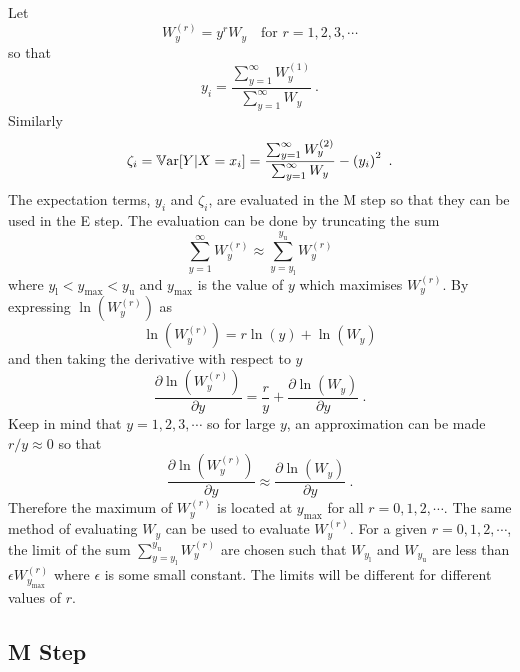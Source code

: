 Let
\begin{equation}
  W_y^{(r)} = y^r W_y \quad \text{for }r=1,2,3,\cdots
\end{equation}
so that
\begin{equation}
  y_i = \frac{\sum_{y=1}^\infty W^{(1)}_y}{\sum_{y=1}^\infty W_y} \ .
\end{equation}
Similarly
\begin{equation}
  \zeta_i = \operatorname{\mathbb{V}ar}[Y|X=x_i] = \frac{\sum_{y=1}^\infty W^{(2)}_y}{\sum_{y=1}^\infty W_y} - \left(y_i\right)^2
  \ .
\end{equation}
The expectation terms, $y_i$ and $\zeta_i$, are evaluated in the M step so that they can be used in the E step. The evaluation can be done by truncating the sum
\begin{equation}
  \sum_{y=1}^\infty W^{(r)}_y \approx \sum_{y=y_\text{l}}^{y_\text{u}} W^{(r)}_y
\end{equation}
where $y_\text{l}<y_\text{max}<y_\text{u}$ and $y_\text{max}$ is the value of $y$ which maximises $W_y^{(r)}$. By expressing $\ln(W^{(r)}_y)$ as
\begin{equation}
  \ln\left(W_y^{(r)}\right)=r\ln(y)+\ln(W_y)
\end{equation}
and then taking the derivative with respect to $y$
\begin{equation}
  \frac{\partial \ln(W_y^{(r)})}{\partial y} = \frac{r}{y } + \frac{\partial \ln(W_y)}{\partial y}
  \ .
\end{equation}
Keep in mind that $y=1,2,3,\cdots$ so for large $y$, an approximation can be made $r/y\approx 0$ so that
\begin{equation}
  \frac{\partial \ln(W_y^{(r)})}{\partial y} \approx \frac{\partial \ln(W_y)}{\partial y}
  \ .
\end{equation}
Therefore the maximum of $W_y^{(r)}$ is located at $y_\text{max}$ for all $r=0,1,2,\cdots$. The same method of evaluating $W_y$ can be used to evaluate $W_y^{(r)}$. For a given $r=0,1,2,\cdots$, the limit of the sum $\sum_{y=y_\text{l}}^{y_\text{u}} W^{(r)}_y$ are chosen such that $W_{y_\text{l}}$ and $W_{y_\text{u}}$ are less than $\epsilon W_{y_\text{max}}^{(r)}$ where $\epsilon$ is some small constant. The limits will be different for different values of $r$.

\subsection{M Step}

